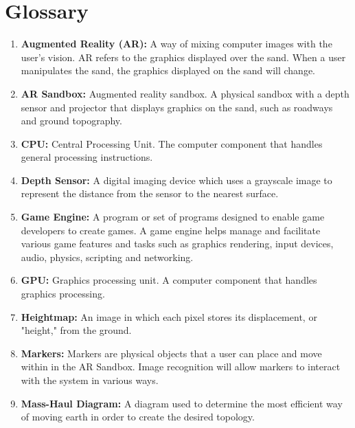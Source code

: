 \documentclass[letterpaper, 10pt, onecolumn, draftclsnofoot]{IEEEtran}
\begin{document}
\section{Glossary} 
    \begin{enumerate}[label=]
         \item {\textbf{Augmented Reality (AR):} A way of mixing computer images with the user’s vision. AR refers to the graphics displayed over the sand. When a user manipulates the sand, the graphics displayed on the sand will change.} 
         
        \item {\textbf{AR Sandbox:} Augmented reality sandbox. A physical sandbox with a depth sensor and projector that displays graphics on the sand, such as roadways and ground topography.}
        
        \item {\textbf{CPU:} Central Processing Unit. The computer component that handles general processing instructions.}
         
        \item {\textbf{Depth Sensor:} A digital imaging device which uses a grayscale image to represent the distance from the sensor to the nearest surface.}
        
        \item{\textbf{Game Engine:} A program or set of programs designed to enable game developers to create games. A game engine helps manage and facilitate various game features and tasks such as graphics rendering, input devices, audio, physics, scripting and networking.}
        
        \item {\textbf{GPU:} Graphics processing unit. A computer component that handles graphics processing.}
        
        \item \textbf{Heightmap:} An image in which each pixel stores its displacement, or "height," from the ground.
        
        \item {\textbf{Markers:} Markers are physical objects that a user can place and move within in the AR Sandbox. Image recognition will allow markers to interact with the system in various ways.}   
        
        \item \textbf{Mass-Haul Diagram:} A diagram used to determine the most efficient way of moving earth in order to create the desired topology. 
        

\end{enumerate}
\end{document}
